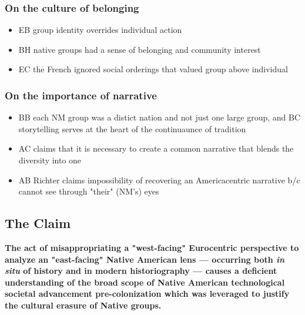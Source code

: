 \documentclass[letterpaper]{article}
\begin{document}
\subsubsection{On the culture of belonging}
\label{sec:org7867993}
\begin{itemize}
\item EB group identity overrides individual action
\item BH native groups had a sense of belonging and community interest
\item EC the French ignored social orderings that valued group above individual
\end{itemize}

\subsubsection{On the importance of narrative}
\label{sec:org1030737}
\begin{itemize}
\item BB each NM group was a distict nation and not just one large group, and BC storytelling serves at the heart of the continuaunce of tradition
\item AC claims that it is necessary to create a common narrative that blends the diversity into one
\item AB Richter claims impossibility of recovering an Americacentric narrative b/c cannot see through "their" (NM's) eyes
\end{itemize}

\subsection{The Claim}
\label{sec:org23b2215}
\textbf{\textbf{The act of misappropriating a "west-facing" Eurocentric perspective to analyze an "east-facing" Native American lens --- occurring both \emph{in situ} of history and in modern historiography --- causes a deficient understanding of the broad scope of Native American technological societal advancement pre-colonization which was leveraged to justify the cultural erasure of Native groups.}}
\end{document}
